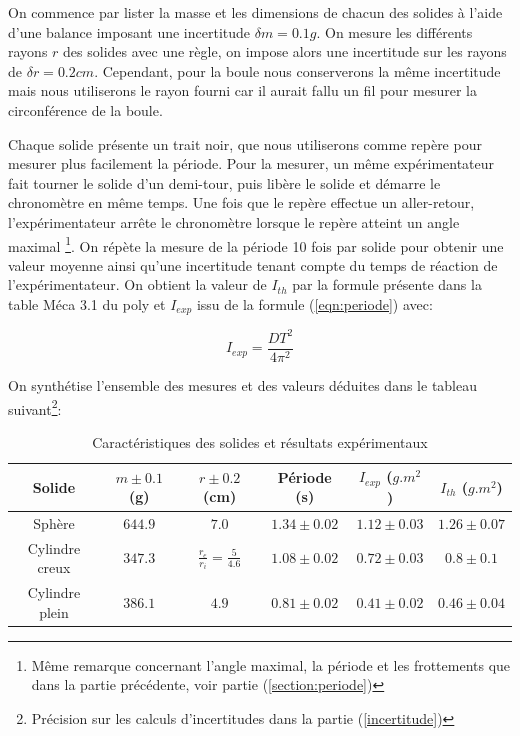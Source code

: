 \documentclass[11pt]{article}
\begin{document}
On commence par lister la masse et les dimensions de chacun des solides à l'aide d'une balance imposant une incertitude $\delta m = 0.1g$.
On mesure les différents rayons $r$ des solides avec une règle, on impose alors une incertitude sur les rayons de $\delta r = 0.2cm$. Cependant, pour la boule nous conserverons
la même incertitude mais nous utiliserons le rayon fourni car il aurait fallu un fil pour mesurer la circonférence de la boule.

Chaque solide présente un trait noir, que nous utiliserons comme repère pour mesurer plus facilement la période. Pour la mesurer,
un même expérimentateur fait tourner le solide d'un demi-tour, puis libère le solide et démarre le chronomètre en même temps. 
Une fois que le repère effectue un aller-retour, l'expérimentateur arrête le chronomètre lorsque 
le repère atteint un angle maximal \footnote{Même remarque concernant l'angle maximal, la période et les frottements que dans la partie précédente, voir partie (\ref{section:periode})}.
On répète la mesure de la période 10 fois par solide pour obtenir une valeur moyenne ainsi qu'une incertitude tenant compte du temps de réaction
de l'expérimentateur. On obtient la valeur de $I_{th}$ par la formule présente dans la table Méca 3.1 du poly et $I_{exp}$ issu de la formule (\ref{eqn:periode}) avec:

\begin{equation}
    I_{exp} = \frac{DT^2}{4\pi^2} 
\end{equation}

On synthétise l'ensemble des mesures et des valeurs déduites dans le tableau suivant\footnote{Précision sur les calculs d'incertitudes dans la partie (\ref{incertitude})}:

\begin{table}[h!]
	\centering
	\begin{tabular}{||c c c c c c||} 
		\hline
		Solide          & $m \pm 0.1$ (g)  & $r \pm 0.2$ (cm)  & Période (s) & $I_{exp}$ ($g.m^2$)& $I_{th}$ ($g.m^2$)\\
		\hline
        Sphère          & $644.9$ & $7.0$ & $1.34 \pm 0.02$ & $1.12 \pm 0.03$ & $1.26 \pm 0.07$ \\
        Cylindre creux  & $347.3$ & $\frac{r_e}{r_i} = \frac{5}{4.6}$ & $1.08 \pm 0.02$ & $0.72 \pm 0.03$ & $0.8 \pm 0.1$ \\
        Cylindre plein  & $386.1$ & $4.9$ & $0.81 \pm 0.02$ & $0.41 \pm 0.02$ & $0.46 \pm 0.04$ \\
		\hline
	\end{tabular}
	\caption{Caractéristiques des solides et résultats expérimentaux}
	\label{table:1}
\end{table}
\end{document}

